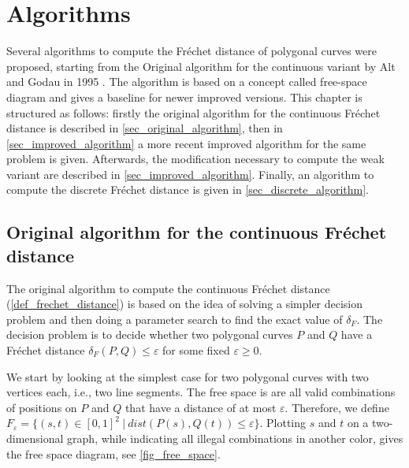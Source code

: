 \documentclass[
oneside,
fontsize=11pt
]{scrartcl}
\begin{document}






\section{Algorithms}
Several algorithms to compute the Fréchet distance of polygonal curves were proposed, 
starting from the Original algorithm for the continuous variant by Alt and Godau in 1995 \cite{alt_computing_1995}.
The algorithm is based on a concept called free-space diagram and gives a baseline for newer improved versions. 
This chapter is structured as follows: 
firstly the original algorithm for the continuous Fréchet distance is described in \autoref{sec_original_algorithm},
then in \autoref{sec_improved_algorithm} a more recent improved algorithm for the same problem is given.
Afterwards, the modification necessary to compute the weak variant are described in \autoref{sec_improved_algorithm}.
Finally, an algorithm to compute the discrete Fréchet distance is given in \autoref{sec_discrete_algorithm}.


\subsection{Original algorithm for the continuous Fréchet distance}
\label{sec_original_algorithm}
The original algorithm to compute the continuous Fréchet distance (\autoref{def_frechet_distance})
is based on the idea of solving a simpler decision problem and then doing a parameter search to find the exact value of $\delta_{F}$.
The decision problem is to decide whether two polygonal curves $P$ and $Q$ have a 
Fréchet distance $\delta_{F}(P,Q) \leq \varepsilon$ for some fixed $\varepsilon \geq 0$.

We start by looking at the simplest case for two polygonal curves with two vertices each, i.e., two line segments.
The free space is are all valid combinations of positions on $P$ and $Q$ that have a distance of at most $\varepsilon$.
Therefore, we define $F_\varepsilon = \{(s,t) \in [0,1]^2 \ | \ dist(P(s), Q(t)) \leq \varepsilon \}$.
Plotting $s$ and $t$ on a two-dimensional graph, while indicating all illegal combinations in 
another color, gives the free space diagram, see \autoref{fig_free_space}. \cite{alt_computing_1995}
\end{document}
